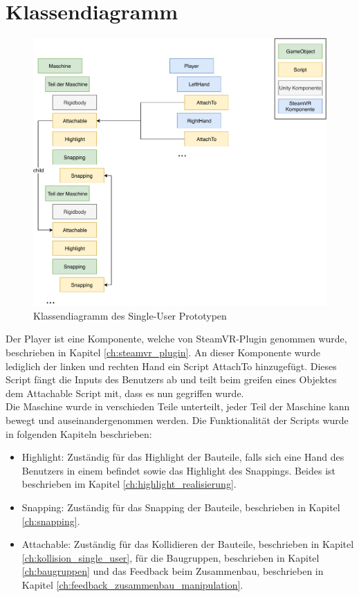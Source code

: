 \section{Klassendiagramm}
\label{ch:klassendiagram_single_user}

\begin{figure}[h!]
	\centering
	\includegraphics[keepaspectratio,width=0.75\linewidth]{img/Klassendiagramm_T1.pdf}
	\caption{Klassendiagramm des Single-User Prototypen}
	\label{fig:klassendiagramm_single_user}
\end{figure}

Der \grqq Player\grqq{} ist eine Komponente, welche von SteamVR-Plugin genommen wurde, beschrieben in Kapitel \ref{ch:steamvr_plugin}. An dieser Komponente wurde lediglich der linken und rechten Hand ein Script \grqq AttachTo\grqq{} hinzugefügt. Dieses Script fängt die Inputs des Benutzers ab und teilt beim greifen eines Objektes dem \grqq Attachable\grqq{} Script mit, dass es nun gegriffen wurde. \\

\noindent Die Maschine wurde in verschieden Teile unterteilt, jeder Teil der Maschine kann bewegt und auseinandergenommen werden. Die Funktionalität der Scripts wurde in folgenden Kapiteln beschrieben:

\begin{itemize} [itemsep=1pt,topsep=0pt]	
	\item Highlight: Zuständig für das Highlight der Bauteile, falls sich eine Hand des Benutzers in einem befindet sowie das Highlight des Snappings. Beides ist beschrieben im Kapitel \ref{ch:highlight_realisierung}.
	
	\item Snapping: Zuständig für das Snapping der Bauteile, beschrieben in Kapitel \ref{ch:snapping}.
	
	\item Attachable: Zuständig für das Kollidieren der Bauteile, beschrieben in Kapitel \ref{ch:kollision_single_user}, für die Baugruppen, beschrieben in Kapitel \ref{ch:baugruppen} und das Feedback beim Zusammenbau, beschrieben in Kapitel \ref{ch:feedback_zusammenbau_manipulation}.
\end{itemize}